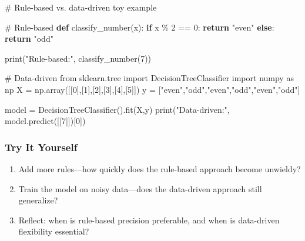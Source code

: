 \documentclass[
  letterpaper,
  DIV=11,
  numbers=noendperiod]{scrreprt}
\newenvironment{Shaded}{\begin{snugshade}}{\end{snugshade}}
\newcommand{\BuiltInTok}[1]{\textcolor[rgb]{0.00,0.23,0.31}{#1}}
\newcommand{\CommentTok}[1]{\textcolor[rgb]{0.37,0.37,0.37}{#1}}
\newcommand{\ControlFlowTok}[1]{\textcolor[rgb]{0.00,0.23,0.31}{\textbf{#1}}}
\newcommand{\DecValTok}[1]{\textcolor[rgb]{0.68,0.00,0.00}{#1}}
\newcommand{\ImportTok}[1]{\textcolor[rgb]{0.00,0.46,0.62}{#1}}
\newcommand{\KeywordTok}[1]{\textcolor[rgb]{0.00,0.23,0.31}{\textbf{#1}}}
\newcommand{\NormalTok}[1]{\textcolor[rgb]{0.00,0.23,0.31}{#1}}
\newcommand{\OperatorTok}[1]{\textcolor[rgb]{0.37,0.37,0.37}{#1}}
\newcommand{\StringTok}[1]{\textcolor[rgb]{0.13,0.47,0.30}{#1}}
\providecommand{\tightlist}{%
  \setlength{\itemsep}{0pt}\setlength{\parskip}{0pt}}
\begin{document}
\begin{Shaded}
\begin{Highlighting}[]
\CommentTok{\# Rule{-}based vs. data{-}driven toy example}

\CommentTok{\# Rule{-}based}
\KeywordTok{def}\NormalTok{ classify\_number(x):}
    \ControlFlowTok{if}\NormalTok{ x }\OperatorTok{\%} \DecValTok{2} \OperatorTok{==} \DecValTok{0}\NormalTok{:}
        \ControlFlowTok{return} \StringTok{"even"}
    \ControlFlowTok{else}\NormalTok{:}
        \ControlFlowTok{return} \StringTok{"odd"}

\BuiltInTok{print}\NormalTok{(}\StringTok{"Rule{-}based:"}\NormalTok{, classify\_number(}\DecValTok{7}\NormalTok{))}

\CommentTok{\# Data{-}driven}
\ImportTok{from}\NormalTok{ sklearn.tree }\ImportTok{import}\NormalTok{ DecisionTreeClassifier}
\ImportTok{import}\NormalTok{ numpy }\ImportTok{as}\NormalTok{ np}
\NormalTok{X }\OperatorTok{=}\NormalTok{ np.array([[}\DecValTok{0}\NormalTok{],[}\DecValTok{1}\NormalTok{],[}\DecValTok{2}\NormalTok{],[}\DecValTok{3}\NormalTok{],[}\DecValTok{4}\NormalTok{],[}\DecValTok{5}\NormalTok{]])}
\NormalTok{y }\OperatorTok{=}\NormalTok{ [}\StringTok{"even"}\NormalTok{,}\StringTok{"odd"}\NormalTok{,}\StringTok{"even"}\NormalTok{,}\StringTok{"odd"}\NormalTok{,}\StringTok{"even"}\NormalTok{,}\StringTok{"odd"}\NormalTok{]}

\NormalTok{model }\OperatorTok{=}\NormalTok{ DecisionTreeClassifier().fit(X,y)}
\BuiltInTok{print}\NormalTok{(}\StringTok{"Data{-}driven:"}\NormalTok{, model.predict([[}\DecValTok{7}\NormalTok{]])[}\DecValTok{0}\NormalTok{])}
\end{Highlighting}
\end{Shaded}

\subsubsection{Try It Yourself}\label{try-it-yourself-54}

\begin{enumerate}
\def\labelenumi{\arabic{enumi}.}
\tightlist
\item
  Add more rules---how quickly does the rule-based approach become
  unwieldy?
\item
  Train the model on noisy data---does the data-driven approach still
  generalize?
\item
  Reflect: when is rule-based precision preferable, and when is
  data-driven flexibility essential?
\end{enumerate}
\end{document}
